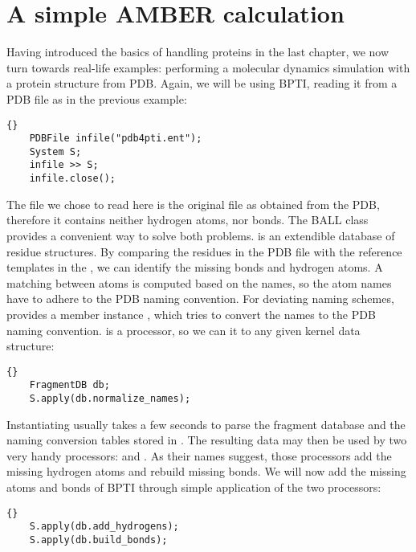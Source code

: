 \section{A simple AMBER calculation}


Having introduced the basics of handling proteins in the last chapter, we now
turn towards real-life examples: performing a molecular dynamics simulation
with a protein structure from PDB. Again, we will be using BPTI, reading it
from a PDB file as in the previous example:

\begin{lstlisting}{}
	PDBFile	infile("pdb4pti.ent");
	System S;
	infile >> S;
	infile.close();
\end{lstlisting}

\noindent
The file we chose to read here is the original file as obtained from
the PDB, therefore it contains neither hydrogen atoms, nor bonds.
The BALL class  provides a convenient way to solve
both problems.  is an extendible database of residue
structures. By comparing the residues in the PDB file with the reference
templates in the , we can identify the missing bonds
and hydrogen atoms. A matching between atoms is computed based on the names,
so the atom names have to adhere to the PDB naming convention.
For deviating naming schemes,  provides a member instance
, which tries to convert the names to the PDB 
naming convention.  is a processor, so we
can  it to any given kernel data structure:

\begin{lstlisting}{}
	FragmentDB db;
	S.apply(db.normalize_names);
\end{lstlisting}

\noindent
Instantiating  usually takes a few seconds to parse the
fragment database and the naming conversion tables stored in
. The resulting data may then be used by two
very handy processors:  and .
As their names suggest, those processors add the missing hydrogen atoms and
rebuild missing bonds. We will now add the missing atoms and bonds of BPTI 
through simple application of the two processors:

\begin{lstlisting}{}
	S.apply(db.add_hydrogens);
	S.apply(db.build_bonds);
\end{lstlisting}

